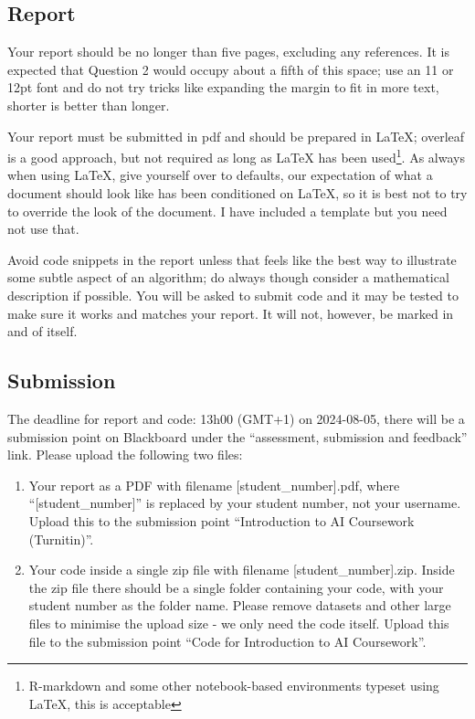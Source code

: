 \documentclass[12pt]{article}
\begin{document}
\subsection*{Report}

Your report should be no longer than five pages, excluding any
references. It is expected that Question 2 would occupy about a fifth
of this space; use an 11 or 12pt font and do not try tricks like
expanding the margin to fit in more text, shorter is better than
longer.

Your report must be submitted in pdf and should be prepared in LaTeX;
overleaf is a good approach, but not required as long as LaTeX has
been used\footnote{R-markdown and some other notebook-based environments typeset using LaTeX, this is acceptable}. As always when using LaTeX, give yourself over to defaults,
our expectation of what a document should look like has been
conditioned on LaTeX, so it is best not to try to override the look of
the document. I have included a template but you need not use that.

Avoid code snippets in the report unless that feels like the best way
to illustrate some subtle aspect of an algorithm; do always though
consider a mathematical description if possible. You will be asked to
submit code and it may be tested to make sure it works and matches
your report. It will not, however, be marked in and of itself.


\subsection*{Submission}

The deadline for report and code: 13h00 (GMT+1) on 2024-08-05, there
will be a submission point on Blackboard under the ``assessment,
submission and feedback'' link. Please upload the following two files:
\begin{enumerate}
\item Your report as a PDF with filename [student\_number].pdf, where ``[student\_number]'' is replaced by your student number, not your username. Upload this to the submission point ``Introduction to AI Coursework (Turnitin)''.
\item Your code inside a single zip file with filename
  [student\_number].zip. Inside the zip file there should be a single
  folder containing your code, with your student number as the folder
  name. Please remove datasets and other large files to minimise the
  upload size - we only need the code itself. Upload this file to the
  submission point ``Code for Introduction to AI Coursework''.
\end{enumerate}
  
\end{document}
